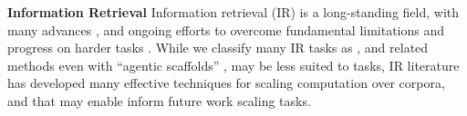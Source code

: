 

\textbf{Information Retrieval} Information retrieval (IR) \cite{TREC2021} is a long-standing field, with many advances \cite{Khattab2020ColBERTEA}, and ongoing efforts to overcome fundamental limitations \cite{Weller2025OnTT} and progress on harder tasks \cite{Su2024BRIGHTAR, Wei2025BrowseCompAS}. While we classify many IR tasks as  \cname, and related methods even with ``agentic scaffolds'' \citep{Zhang2025RecursiveLM}, may be less suited to  tasks, IR literature has developed many effective techniques \citep{HarPeled2012ApproximateNN} for scaling computation over corpora, and that may enable inform future work scaling  tasks.

